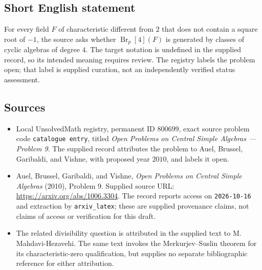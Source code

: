 \documentclass[11pt]{article}
\begin{document}
\subsection{Short English statement}
For every field \(F\) of characteristic different from \(2\) that does not contain a square root of \(-1\), the source asks whether \(\operatorname{Br}_p[4](F)\) is generated by classes of cyclic algebras of degree \(4\). The target notation is undefined in the supplied record, so its intended meaning requires review. The registry labels the problem open; that label is supplied curation, not an independently verified status assessment.
\subsection{Sources}
\begin{itemize}
\item Local UnsolvedMath registry, permanent ID \(800699\), exact source problem code \texttt{catalogue entry}, titled \emph{Open Problems on Central Simple Algebras --- Problem 9}. The supplied record attributes the problem to Auel, Brussel, Garibaldi, and Vishne, with proposed year \(2010\), and labels it open.
\item Auel, Brussel, Garibaldi, and Vishne, \emph{Open Problems on Central Simple Algebras} (2010), Problem 9. Supplied source URL: \url{https://arxiv.org/abs/1006.3304}. The record reports access on \texttt{2026-10-16} and extraction by \texttt{arxiv\_latex}; these are supplied provenance claims, not claims of access or verification for this draft.
\item The related divisibility question is attributed in the supplied text to M. Mahdavi-Hezavehi. The same text invokes the Merkurjev--Suslin theorem for its characteristic-zero qualification, but supplies no separate bibliographic reference for either attribution.
\end{itemize}
\end{document}
